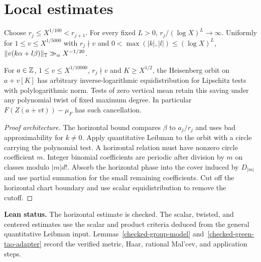 \printgraph



\section{Local estimates}

\begin{lemma}\label{p:heisenberg-phase}
\leanok
{}
Choose $r_j\le X^{1/100}<r_{j+1}$. For every fixed $L>0$,
$r_j/(\log X)^L\to\infty$. Uniformly for $1\le v\le X^{1/5000}$
with $r_j\nmid v$ and $0<\max(|k|,|l|)\le(\log X)^L$,
$\lVert v(k\alpha+l\beta)\rVert_{\mathbb T}\gg_\alpha X^{-1/20}$.

For $a\in\mathbb Z$, $1\le v\le X^{1/10000}$, $r_j\nmid v$ and
$K\ge X^{1/2}$, the Heisenberg orbit on $a+v[K]$
has arbitrary inverse-logarithmic equidistribution for Lipschitz tests
with polylogarithmic norm. Tests of zero vertical mean retain this saving
under any polynomial twist of fixed maximum degree.
In particular $F(Z(a+vt))-\mu_F$ has such cancellation.
\end{lemma}
\begin{proof}[Proof architecture]
\leanok
The horizontal bound compares $\beta$ to $a_j/r_j$ and uses bad
approximability for $k\ne0$. Apply quantitative Leibman to the orbit
with a circle carrying the polynomial test. A horizontal relation
must have nonzero circle coefficient $m$. Integer binomial coefficients
are periodic after division by $m$ on classes modulo $|m|d!$.
Absorb the horizontal phase into the cover induced by $D_{|m|}$
and use partial summation for the small remaining coefficients.
Cut off the horizontal chart boundary and use scalar equidistribution
to remove the cutoff.
\end{proof}
\noindent\textbf{Lean status.} The horizontal estimate is checked.
The scalar, twisted, and centered estimates use the scalar and product
criteria deduced from the general quantitative Leibman input.
Lemmas~\ref{checked-group-model} and~\ref{checked-green-tao-adapter}
record the verified metric, Haar, rational Mal'cev, and application steps.

